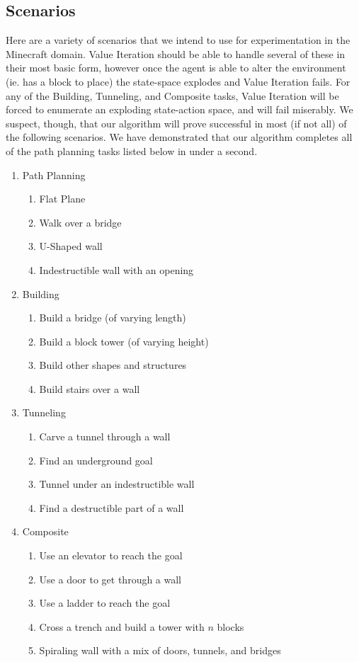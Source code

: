 \documentclass[a4paper]{article}
\begin{document}
\subsection{Scenarios}
Here are a variety of scenarios that we intend to use for experimentation in the Minecraft domain. Value Iteration should be able to handle several of these in their most basic form, however once the agent is able to alter the environment (ie. has a block to place) the state-space explodes and Value Iteration fails. For any of the Building, Tunneling, and Composite tasks, Value Iteration will be forced to enumerate an exploding state-action space, and will fail miserably. We suspect, though, that our algorithm will prove successful in most (if not all) of the following scenarios. We have demonstrated that our algorithm completes all of the path planning tasks listed below in under a second.
\begin{enumerate}
\item Path Planning
\begin{enumerate}
	\item Flat Plane
	\item Walk over a bridge
	\item U-Shaped wall
	\item Indestructible wall with an opening
\end{enumerate}

\item Building
\begin{enumerate}
	\item Build a bridge (of varying length)
	\item Build a block tower (of varying height)
	\item Build other shapes and structures
	\item Build stairs over a wall
\end{enumerate}

\item Tunneling
\begin{enumerate}
	\item Carve a tunnel through a wall
	\item Find an underground goal
	\item Tunnel under an indestructible wall
	\item Find a destructible part of a wall
\end{enumerate}

\item Composite
\begin{enumerate}
	\item Use an elevator to reach the goal
	\item Use a door to get through a wall
	\item Use a ladder to reach the goal
	\item Cross a trench and build a tower with $n$ blocks
	\item Spiraling wall with a mix of doors, tunnels, and bridges
\end{enumerate}
\end{enumerate}
 
\end{document}
